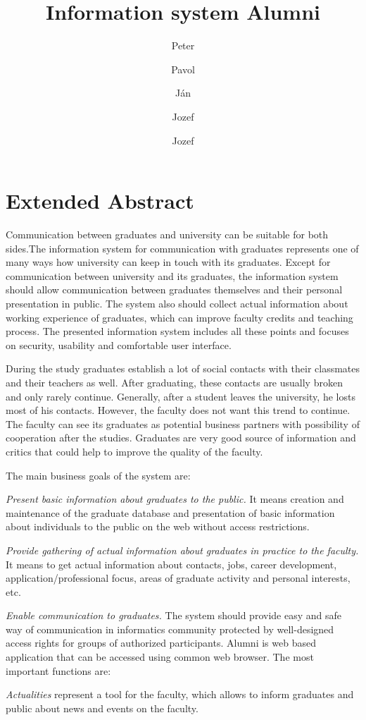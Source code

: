 \documentclass{iitsrc}
\title{Information system Alumni}
\author{Peter}{C\'ich}
\author{Pavol}{F\'abik}
\author{J\'an}{Garaj}
\author{Jozef}{Hergott}
\author{Jozef}{Hopko}
\begin{document}
\section*{Extended Abstract}

Communication between graduates and university can be suitable for both sides.The information system for communication with graduates represents one of many ways how university can keep in touch with its graduates. Except for communication between university and its graduates, the information system should allow communication between graduates themselves and their personal presentation in public. The system also should collect actual information about working experience of graduates, which can improve faculty credits and teaching process. The presented information system includes all these points and focuses on security, usability and comfortable user interface.

During the study graduates establish a lot of social contacts with their classmates and their teachers as well. After graduating, these contacts are usually broken and only rarely continue. Generally, after a student leaves the university, he losts most of his contacts. However, the faculty does not want this trend to continue. The faculty can see its graduates as potential business partners with possibility of cooperation after the studies. Graduates are very good source of information and critics that could help to improve the quality of the faculty.

The main business goals of the system are:

{\em Present basic information about graduates to the public.}
It means creation and maintenance of the graduate database and presentation of basic information about individuals to the public on the web without access restrictions.

{\em Provide gathering of actual information about graduates in practice to the faculty.} 
It means to get actual information about contacts, jobs, career development, application/professional focus, areas of graduate activity and personal interests, etc.

{\em Enable communication to graduates.}
The system should provide easy and safe way of communication in informatics community protected by well-designed access rights for groups of authorized participants.
Alumni is web based application that can be accessed using common web browser. The most important functions are:

{\em Actualities} 
represent a tool for the faculty, which allows to inform graduates and public about news and events on the faculty.
\end{document}
